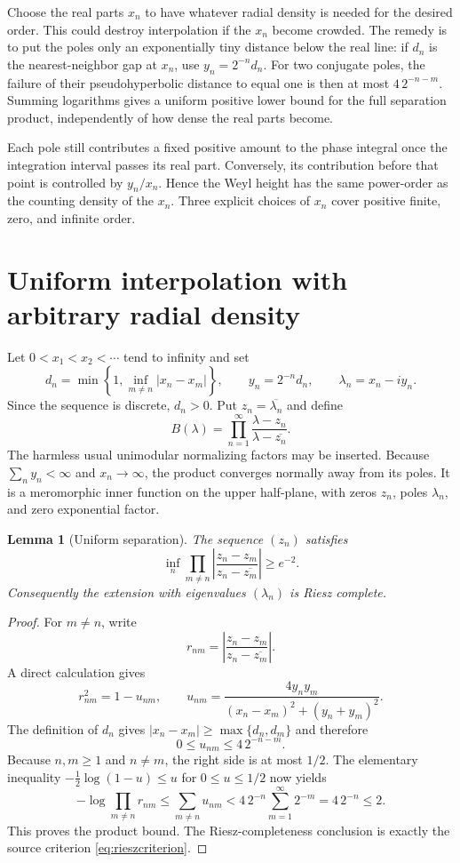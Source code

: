 \documentclass[11pt]{article}
\newtheorem{lemma}{Lemma}
\begin{document}
Choose the real parts $x_n$ to have whatever radial density is needed for the
desired order.  This could destroy interpolation if the $x_n$ become crowded.
The remedy is to put the poles only an exponentially tiny distance below the
real line: if $d_n$ is the nearest-neighbor gap at $x_n$, use
$y_n=2^{-n}d_n$.  For two conjugate poles, the failure of their
pseudohyperbolic distance to equal one is then at most $4\,2^{-n-m}$.
Summing logarithms gives a uniform positive lower bound for the full
separation product, independently of how dense the real parts become.

Each pole still contributes a fixed positive amount to the phase integral
once the integration interval passes its real part.  Conversely, its
contribution before that point is controlled by $y_n/x_n$.  Hence the Weyl
height has the same power-order as the counting density of the $x_n$.  Three
explicit choices of $x_n$ cover positive finite, zero, and infinite order.

\section{Uniform interpolation with arbitrary radial density}

Let $0<x_1<x_2<\cdots$ tend to infinity and set
\[
 d_n=\min\left\{1,\inf_{m\ne n}|x_n-x_m|\right\},\qquad
 y_n=2^{-n}d_n,\qquad \lambda_n=x_n-i y_n.
\]
Since the sequence is discrete, $d_n>0$.  Put $z_n=\overline{\lambda_n}$ and
define
\begin{equation}\label{eq:B}
 B(\lambda)=\prod_{n=1}^{\infty}
 \frac{\lambda-z_n}{\lambda-\overline{z_n}}.
\end{equation}
The harmless usual unimodular normalizing factors may be inserted.  Because
$\sum_n y_n<\infty$ and $x_n\to\infty$, the product converges normally away
from its poles.  It is a meromorphic inner function on the upper half-plane,
with zeros $z_n$, poles $\lambda_n$, and zero exponential factor.

\begin{lemma}[Uniform separation]\label{lem:separation}
The sequence $(z_n)$ satisfies
\[
 \inf_n\prod_{m\ne n}
 \left|\frac{z_n-z_m}{z_n-\overline{z_m}}\right|\ge e^{-2}.
\]
Consequently the extension with eigenvalues $(\lambda_n)$ is Riesz complete.
\end{lemma}

\begin{proof}
For $m\ne n$, write
\[
 r_{nm}=\left|\frac{z_n-z_m}{z_n-\overline{z_m}}\right|.
\]
A direct calculation gives
\[
 r_{nm}^2=1-u_{nm},\qquad
 u_{nm}=\frac{4y_ny_m}
 {(x_n-x_m)^2+(y_n+y_m)^2}.
\]
The definition of $d_n$ gives
$|x_n-x_m|\ge\max\{d_n,d_m\}$ and therefore
\[
 0\le u_{nm}\le4\,2^{-n-m}.
\]
Because $n,m\ge1$ and $n\ne m$, the right side is at most $1/2$.  The
elementary inequality $-\frac12\log(1-u)\le u$ for $0\le u\le1/2$ now yields
\[
 -\log\prod_{m\ne n}r_{nm}
 \le\sum_{m\ne n}u_{nm}
 <4\,2^{-n}\sum_{m=1}^{\infty}2^{-m}
 =4\,2^{-n}\le2.
\]
This proves the product bound.  The Riesz-completeness conclusion is exactly
the source criterion \eqref{eq:rieszcriterion}.
\end{proof}
\end{document}
